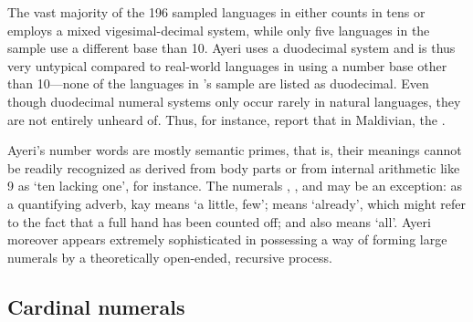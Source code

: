 The vast majority of the 196 sampled languages in \citet{wals131} either counts
in tens or employs a mixed vigesimal-decimal system, while only five languages
in the sample use a different base than 10. Ayeri uses a duodecimal system and
is thus very untypical compared to real-world languages in using a number base
other than 10---none of the languages in \citet{wals131}'s sample are listed as
duodecimal.
Even though duodecimal numeral systems only occur rarely in natural languages,
they are not entirely unheard of. Thus, for instance, \citet{caingair2000}
report that in Maldivian, the .

Ayeri's number words are mostly semantic primes, that is, their meanings cannot
be readily recognized as derived from body parts \citep[74]{dixon2012} or from
internal arithmetic like 9 as `ten lacking one', for instance. The numerals
, , and  may
be an exception: as a quantifying adverb,  {kay} means `a little,
few';  means `already', which might refer to the fact that a
full hand has been counted off; and  also means `all'. Ayeri
moreover appears extremely sophisticated in possessing a way of forming large
numerals by a theoretically open-ended, recursive process.

\subsection{Cardinal numerals}

